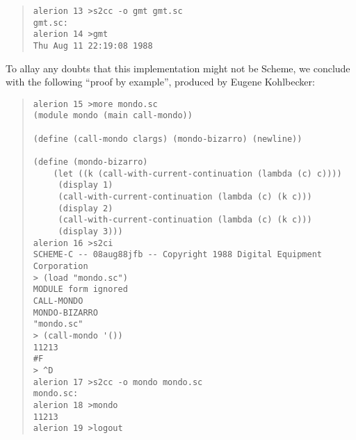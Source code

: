 \documentclass[11pt]{article}
\begin{document}
\begin{small}
\begin{quote}
\begin{verbatim}
alerion 13 >s2cc -o gmt gmt.sc
gmt.sc:
alerion 14 >gmt
Thu Aug 11 22:19:08 1988
\end{verbatim}
\end{quote}
\end{small}

To allay any doubts that this implementation might not be
Scheme, we conclude with the following ``proof by example'',
produced by Eugene Kohlbecker:

\begin{small}
\begin{quote}
\begin{verbatim}
alerion 15 >more mondo.sc
(module mondo (main call-mondo))

(define (call-mondo clargs) (mondo-bizarro) (newline))

(define (mondo-bizarro)
    (let ((k (call-with-current-continuation (lambda (c) c))))
	 (display 1)
	 (call-with-current-continuation (lambda (c) (k c)))
	 (display 2)
	 (call-with-current-continuation (lambda (c) (k c)))
	 (display 3)))
alerion 16 >s2ci
SCHEME-C -- 08aug88jfb -- Copyright 1988 Digital Equipment Corporation
> (load "mondo.sc")
MODULE form ignored
CALL-MONDO
MONDO-BIZARRO
"mondo.sc"
> (call-mondo '())
11213
#F
> ^D
alerion 17 >s2cc -o mondo mondo.sc
mondo.sc:
alerion 18 >mondo
11213
alerion 19 >logout
\end{verbatim}
\end{quote}
\end{small}
\end{document}
